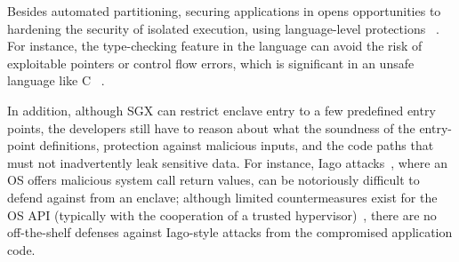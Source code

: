 {%

Besides automated partitioning,
securing \java{} applications in \sgx{} opens opportunities to hardening the security of isolated execution,
using language-level protections
~\citep{bittau2008wedge,brumley2004privtrans,khatiwala2006data}.
For instance, the type-checking feature in the \java{} language
can avoid the risk of exploitable pointers or control flow errors,
which is significant in an unsafe language like C
~\citep{nergal2001libc,bletsch2011jump,checkoway2010return}.

In addition, although SGX can restrict enclave entry 
to a few predefined entry points,
the developers still have to reason about what the soundness of the
entry-point definitions, protection against malicious inputs,
and the code paths that must not inadvertently leak sensitive data.
For instance, Iago attacks~\citep{checkoway13iago}, where an OS offers malicious system call return values,
can be notoriously difficult to defend against from an enclave;
although limited countermeasures exist for the OS API (typically with the cooperation of a 
trusted hypervisor)~\citep{kwon2016sego},%
there are no off-the-shelf defenses against Iago-style attacks from the compromised application code.

}
